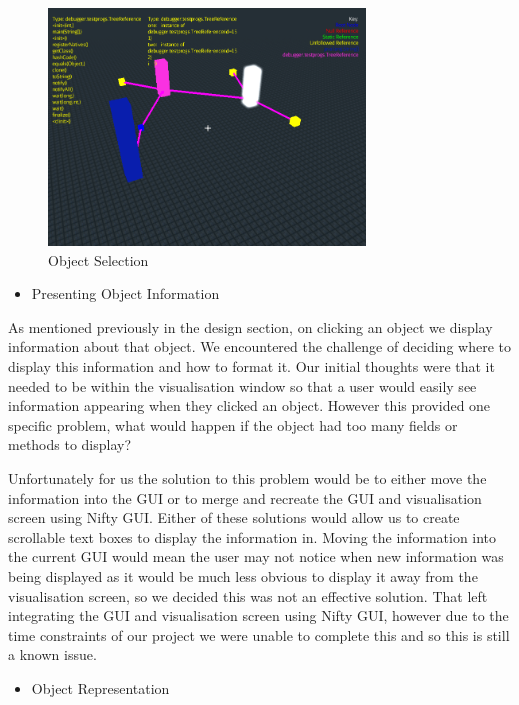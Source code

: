 \documentclass[11pt, a4paper]{report}
\begin{document}
\begin{figure}[h]
        \centering
        \includegraphics[width=0.75\textwidth]{images/final/objectselect.png}
        \caption{Object Selection}
\end{figure}

\begin{itemize}
  \item Presenting Object Information
\end{itemize}

As mentioned previously in the design section, on clicking an object we display information about that object. We encountered the challenge of deciding where to display this information and how to format it. Our initial thoughts were that it needed to be within the visualisation window so that a user would easily see information appearing when they clicked an object. However this provided one specific problem, what would happen if the object had too many fields or methods to display? 

Unfortunately for us the solution to this problem would be to either move the information into the GUI or to merge and recreate the GUI and visualisation screen using Nifty GUI. Either of these solutions would allow us to create scrollable text boxes to display the information in. Moving the information into the current GUI would mean the user may not notice when new information was being displayed as it would be much less obvious to display it away from the visualisation screen, so we decided this was not an effective solution. That left integrating the GUI and visualisation screen using Nifty GUI, however due to the time constraints of our project we were unable to complete this and so this is still a known issue.

\begin{itemize}
  \item Object Representation
\end{itemize}
\end{document}
